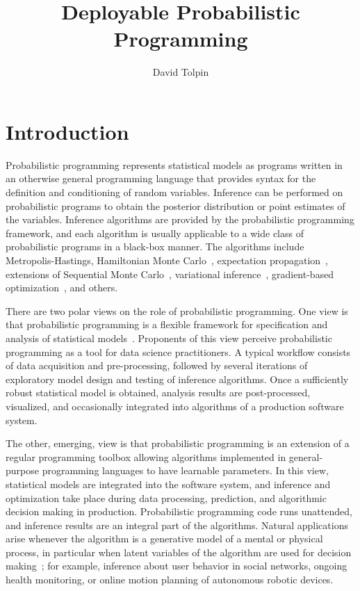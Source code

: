 \documentclass[sigplan,review,10pt,anonymous]{acmart}
\title{Deployable Probabilistic Programming}
\author{David Tolpin}
\affiliation{
    \institution{PUB+}
    \country{Israel}
}
\begin{document}
\maketitle

\begin{sloppypar}

\section{Introduction}

  Probabilistic programming \cite{GMR+08,MSP14,WVM14,GS15}
  represents statistical models as programs written in an
  otherwise general programming language that provides syntax
  for the definition and conditioning of random variables.
  Inference can be performed on probabilistic programs to
  obtain the posterior distribution or point estimates of the
  variables. Inference algorithms are provided by the
  probabilistic programming framework, and each algorithm is
  usually applicable to a wide class of probabilistic programs
  in a black-box manner. The algorithms include
  Metropolis-Hastings\cite{WSG11,MSP14,YHG14}, Hamiltonian
  Monte Carlo~\cite{Stan17}, expectation
  propagation~\cite{MWG+10}, extensions of Sequential Monte
  Carlo~\cite{WVM14,MYM+15,PWD+14,RNL+2016}, variational
  inference~\cite{WW13,KTR+17}, gradient-based
  optimization~\cite{Stan17,BCJ+19}, and others.

  There are two polar views on the role of probabilistic
  programming.  One view is that probabilistic programming is
  a flexible framework for specification and analysis of
  statistical models~\cite{WSG11,TMY+16,GXG18}. Proponents of
  this view perceive probabilistic programming as a tool for
  data science practitioners. A typical workflow consists of
  data acquisition and pre-processing, followed by several
  iterations of exploratory model design and testing of
  inference algorithms. Once a sufficiently robust statistical
  model is obtained, analysis results are post-processed,
  visualized, and occasionally integrated into algorithms of a
  production software system. 

  The other, emerging, view is that probabilistic programming
  is an extension of a regular programming toolbox allowing
  algorithms implemented in general-purpose programming
  languages to have learnable parameters. In this view,
  statistical models are integrated into the software system,
  and inference and optimization take place during data
  processing, prediction, and algorithmic decision making in
  production.  Probabilistic programming code runs unattended,
  and inference results are an integral part of the
  algorithms. Natural applications arise whenever the algorithm
  is a generative model of a mental or physical process, in
  particular when latent variables of the algorithm are used for
  decision making~\cite{GT+16,WBD+19}; for example, inference
  about user behavior in social networks, ongoing health
  monitoring, or online motion planning of autonomous robotic
  devices.


\end{sloppypar}
\end{document}
